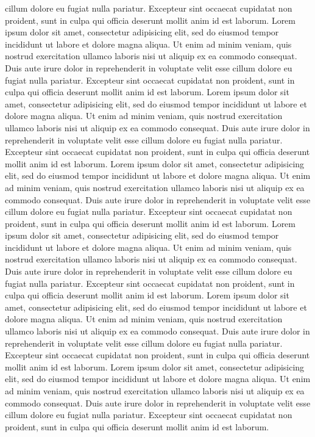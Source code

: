        cillum dolore eu fugiat nulla pariatur. Excepteur sint occaecat cupidatat non
       proident, sunt in culpa qui officia deserunt mollit anim id est laborum.
       Lorem ipsum dolor sit amet, consectetur adipisicing elit, sed do eiusmod
       tempor incididunt ut labore et dolore magna aliqua. Ut enim ad minim veniam,
       quis nostrud exercitation ullamco laboris nisi ut aliquip ex ea commodo
       consequat. Duis aute irure dolor in reprehenderit in voluptate velit esse
       cillum dolore eu fugiat nulla pariatur. Excepteur sint occaecat cupidatat non
       proident, sunt in culpa qui officia deserunt mollit anim id est laborum.
       Lorem ipsum dolor sit amet, consectetur adipisicing elit, sed do eiusmod
       tempor incididunt ut labore et dolore magna aliqua. Ut enim ad minim veniam,
       quis nostrud exercitation ullamco laboris nisi ut aliquip ex ea commodo
       consequat. Duis aute irure dolor in reprehenderit in voluptate velit esse
       cillum dolore eu fugiat nulla pariatur. Excepteur sint occaecat cupidatat non
       proident, sunt in culpa qui officia deserunt mollit anim id est laborum.
       Lorem ipsum dolor sit amet, consectetur adipisicing elit, sed do eiusmod
       tempor incididunt ut labore et dolore magna aliqua. Ut enim ad minim veniam,
       quis nostrud exercitation ullamco laboris nisi ut aliquip ex ea commodo
       consequat. Duis aute irure dolor in reprehenderit in voluptate velit esse
       cillum dolore eu fugiat nulla pariatur. Excepteur sint occaecat cupidatat non
       proident, sunt in culpa qui officia deserunt mollit anim id est laborum.
       Lorem ipsum dolor sit amet, consectetur adipisicing elit, sed do eiusmod
       tempor incididunt ut labore et dolore magna aliqua. Ut enim ad minim veniam,
       quis nostrud exercitation ullamco laboris nisi ut aliquip ex ea commodo
       consequat. Duis aute irure dolor in reprehenderit in voluptate velit esse
       cillum dolore eu fugiat nulla pariatur. Excepteur sint occaecat cupidatat non
       proident, sunt in culpa qui officia deserunt mollit anim id est laborum.
       Lorem ipsum dolor sit amet, consectetur adipisicing elit, sed do eiusmod
       tempor incididunt ut labore et dolore magna aliqua. Ut enim ad minim veniam,
       quis nostrud exercitation ullamco laboris nisi ut aliquip ex ea commodo
       consequat. Duis aute irure dolor in reprehenderit in voluptate velit esse
       cillum dolore eu fugiat nulla pariatur. Excepteur sint occaecat cupidatat non
       proident, sunt in culpa qui officia deserunt mollit anim id est laborum.
       Lorem ipsum dolor sit amet, consectetur adipisicing elit, sed do eiusmod
       tempor incididunt ut labore et dolore magna aliqua. Ut enim ad minim veniam,
       quis nostrud exercitation ullamco laboris nisi ut aliquip ex ea commodo
       consequat. Duis aute irure dolor in reprehenderit in voluptate velit esse
       cillum dolore eu fugiat nulla pariatur. Excepteur sint occaecat cupidatat non
       proident, sunt in culpa qui officia deserunt mollit anim id est laborum.
